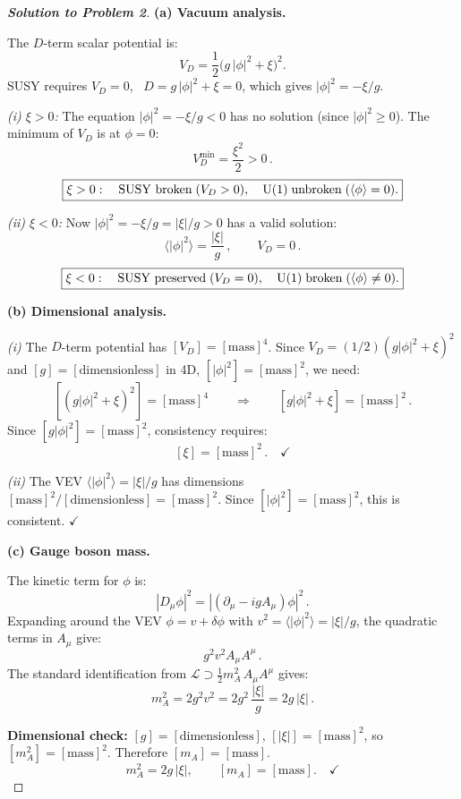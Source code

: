 \documentclass[11pt,a4paper]{article}
\begin{document}
\begin{proof}[\textbf{Solution to Problem 2}]

\textbf{(a) Vacuum analysis.}

The $D$-term scalar potential is:
\[
  V_D = \frac{1}{2}\bigl(g\,|\phi|^2 + \xi\bigr)^2.
\]
SUSY requires $V_D = 0$, \ie\ $D = g\,|\phi|^2 + \xi = 0$, which gives
$|\phi|^2 = -\xi/g$.

\textit{(i) $\xi > 0$:}  The equation $|\phi|^2 = -\xi/g < 0$ has no
solution (since $|\phi|^2 \geq 0$).  The minimum of $V_D$ is at
$\phi = 0$:
\[
  V_D^{\min} = \frac{\xi^2}{2} > 0\,.
\]
\[
  \boxed{\xi > 0:\quad \text{SUSY broken}\; (V_D > 0),\quad
  \mathrm{U}(1)\; \text{unbroken}\; (\langle\phi\rangle = 0).}
\]

\textit{(ii) $\xi < 0$:}  Now $|\phi|^2 = -\xi/g = |\xi|/g > 0$ has
a valid solution:
\[
  \langle|\phi|^2\rangle = \frac{|\xi|}{g}\,,
  \qquad V_D = 0\,.
\]
\[
  \boxed{\xi < 0:\quad \text{SUSY preserved}\; (V_D = 0),\quad
  \mathrm{U}(1)\; \text{broken}\; (\langle\phi\rangle \neq 0).}
\]

\bigskip

\textbf{(b) Dimensional analysis.}

\textit{(i)} The $D$-term potential has $[V_D] = [\mathrm{mass}]^4$.
Since $V_D = (1/2)(g|\phi|^2 + \xi)^2$ and $[g] = [\text{dimensionless}]$
in 4D, $[|\phi|^2] = [\mathrm{mass}]^2$, we need:
\[
  [(g|\phi|^2 + \xi)^2] = [\mathrm{mass}]^4
  \qquad\Longrightarrow\qquad
  [g|\phi|^2 + \xi] = [\mathrm{mass}]^2\,.
\]
Since $[g|\phi|^2] = [\mathrm{mass}]^2$, consistency requires:
\[
  \boxed{[\xi] = [\mathrm{mass}]^2\,.}
  \quad\checkmark
\]

\textit{(ii)} The VEV $\langle|\phi|^2\rangle = |\xi|/g$ has dimensions
$[\mathrm{mass}]^2/[\text{dimensionless}] = [\mathrm{mass}]^2$.  Since
$[|\phi|^2] = [\mathrm{mass}]^2$, this is consistent.
\quad$\checkmark$

\bigskip

\textbf{(c) Gauge boson mass.}

The kinetic term for $\phi$ is:
\[
  |D_\mu\phi|^2 = |(\partial_\mu - igA_\mu)\phi|^2\,.
\]
Expanding around the VEV $\phi = v + \delta\phi$ with $v^2 =
\langle|\phi|^2\rangle = |\xi|/g$, the quadratic terms in $A_\mu$
give:
\[
  g^2 v^2 A_\mu A^\mu\,.
\]
The standard identification from $\mathcal{L} \supset \frac{1}{2}
m_A^2\, A_\mu A^\mu$ gives:
\[
  m_A^2 = 2g^2 v^2 = 2g^2\,\frac{|\xi|}{g} = 2g\,|\xi|\,.
\]

\textbf{Dimensional check:} $[g] = [\text{dimensionless}]$,
$[|\xi|] = [\mathrm{mass}]^2$, so $[m_A^2] = [\mathrm{mass}]^2$.
Therefore $[m_A] = [\mathrm{mass}]$.
\[
  \boxed{m_A^2 = 2g\,|\xi|,\qquad [m_A] = [\mathrm{mass}].}
  \quad\checkmark
\]


\end{proof}
\end{document}
